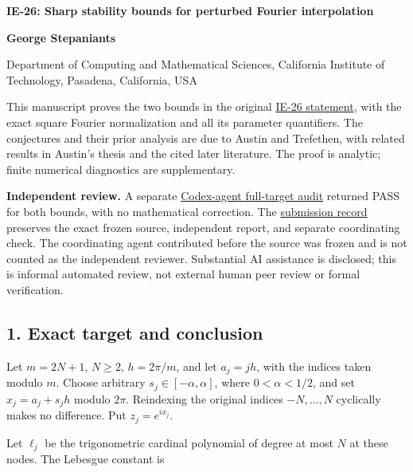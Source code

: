 \documentclass[10pt,a4paper]{article}
\begin{document}
{\raggedright\Large\bfseries IE-26: Sharp stability bounds for perturbed
Fourier interpolation\par}
\vspace{0.4em}
{\normalsize\bfseries George Stepaniants\par}
{\small Department of Computing and Mathematical Sciences, California
Institute of Technology, Pasadena, California, USA\par}
\vspace{0.6em}
This manuscript proves the two bounds in the original
\href{https://github.com/ajt60gaibb/OpenProblemsInNLA/blob/main/linear-systems-and-elimination/IE-26/README.md}{IE-26
statement}, with the exact square Fourier normalization and all its
parameter quantifiers. The conjectures and their prior analysis are due
to Austin and Trefethen, with related results in Austin's thesis and the
cited later literature. The proof is analytic; finite numerical
diagnostics are supplementary.

\textbf{Independent review.} A separate
\href{https://github.com/ajt60gaibb/OpenProblemsInNLA/blob/main/references/stepaniants-ie26-2026-09-12/verification/independent-review/IE-26-independent-review.md}{Codex-agent
full-target audit} returned PASS for both bounds, with no mathematical
correction. The
\href{https://github.com/ajt60gaibb/OpenProblemsInNLA/blob/main/references/stepaniants-ie26-2026-09-12/README.md}{submission
record} preserves the exact frozen source, independent report, and
separate coordinating check. The coordinating agent contributed before
the source was frozen and is not counted as the independent reviewer.
Substantial AI assistance is disclosed; this is informal automated
review, not external human peer review or formal verification.

\subsection{1. Exact target and
conclusion}\label{exact-target-and-conclusion}

Let \(m=2N+1\), \(N\ge2\), \(h=2\pi/m\), and let \(a_j=jh\), with the
indices taken modulo \(m\). Choose arbitrary \(s_j\in[-\alpha,\alpha]\),
where \(0<\alpha<1/2\), and set \(x_j=a_j+s_jh\) modulo \(2\pi\).
Reindexing the original indices \(-N,\ldots,N\) cyclically makes no
difference. Put \(z_j=e^{ix_j}\).

Let \(\ell_j\) be the trigonometric cardinal polynomial of degree at
most \(N\) at these nodes. The Lebesgue constant is
\end{document}
